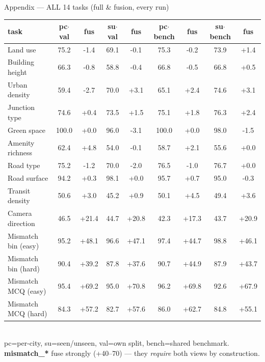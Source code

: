 \documentclass[aspectratio=169]{beamer}
\begin{document}
\begin{frame}{Appendix --- ALL 14 tasks (full \& fusion, every run)}
\centering\scriptsize
\begin{tabular}{lcccccccc}
\toprule
task & pc$\cdot$val & fus & su$\cdot$val & fus & pc$\cdot$bench & fus & su$\cdot$bench & fus \\
\midrule
Land use & 75.2 & \textcolor{bad}{-1.4} & 69.1 & -0.1 & 75.3 & -0.2 & 73.9 & \textcolor{good}{+1.4} \\
Building height & 66.3 & -0.8 & 58.8 & -0.4 & 66.8 & -0.5 & 66.8 & +0.5 \\
Urban density & 59.4 & \textcolor{bad}{-2.7} & 70.0 & \textcolor{good}{+3.1} & 65.1 & \textcolor{good}{+2.4} & 74.6 & \textcolor{good}{+3.1} \\
Junction type & 74.6 & +0.4 & 73.5 & \textcolor{good}{+1.5} & 75.1 & \textcolor{good}{+1.8} & 76.3 & \textcolor{good}{+2.4} \\
Green space & 100.0 & +0.0 & 96.0 & \textcolor{bad}{-3.1} & 100.0 & +0.0 & 98.0 & \textcolor{bad}{-1.5} \\
Amenity richness & 62.4 & \textcolor{good}{+4.8} & 54.0 & -0.1 & 58.7 & \textcolor{good}{+2.1} & 55.6 & +0.0 \\
Road type & 75.2 & \textcolor{bad}{-1.2} & 70.0 & \textcolor{bad}{-2.0} & 76.5 & -1.0 & 76.7 & +0.0 \\
Road surface & 94.2 & +0.3 & 98.1 & +0.0 & 95.7 & +0.7 & 95.0 & -0.3 \\
Transit density & 50.6 & \textcolor{good}{+3.0} & 45.2 & +0.9 & 50.1 & \textcolor{good}{+4.5} & 49.4 & \textcolor{good}{+3.6} \\
\midrule
Camera direction & 46.5 & \textcolor{good}{+21.4} & 44.7 & \textcolor{good}{+20.8} & 42.3 & \textcolor{good}{+17.3} & 43.7 & \textcolor{good}{+20.9} \\
Mismatch bin (easy) & 95.2 & \textcolor{good}{+48.1} & 96.6 & \textcolor{good}{+47.1} & 97.4 & \textcolor{good}{+44.7} & 98.8 & \textcolor{good}{+46.1} \\
Mismatch bin (hard) & 90.4 & \textcolor{good}{+39.2} & 87.8 & \textcolor{good}{+37.6} & 90.7 & \textcolor{good}{+44.9} & 87.9 & \textcolor{good}{+43.7} \\
Mismatch MCQ (easy) & 95.4 & \textcolor{good}{+69.2} & 95.0 & \textcolor{good}{+70.8} & 96.2 & \textcolor{good}{+69.8} & 92.6 & \textcolor{good}{+67.9} \\
Mismatch MCQ (hard) & 84.3 & \textcolor{good}{+57.2} & 82.7 & \textcolor{good}{+57.6} & 86.0 & \textcolor{good}{+62.7} & 84.8 & \textcolor{good}{+55.1} \\
\bottomrule
\end{tabular}\\[4pt]
\scriptsize pc=per-city, su=seen/unseen, val=own split, bench=shared benchmark.
\textbf{mismatch\_*} fuse strongly (+40--70) --- they \emph{require} both views by construction.
\end{frame}
\end{document}
